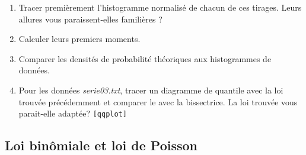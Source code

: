 \documentclass[a4paper,12pt]{article}
\begin{document}
\begin{enumerate}

\item Tracer premièrement l'histogramme normalisé de chacun de ces
tirages. Leurs allures vous paraissent-elles familières ?
\item Calculer leurs premiers moments.
\item Comparer les densités de probabilité théoriques aux histogrammes de
données.
\item Pour les données \textit{serie03.txt}, tracer un diagramme de quantile
avec la loi trouvée précédemment et comparer le avec la bissectrice. La loi trouvée vous
parait-elle adaptée? \texttt{[qqplot]}

\end{enumerate}


\subsection{Loi binômiale et loi de Poisson}
\end{document}
